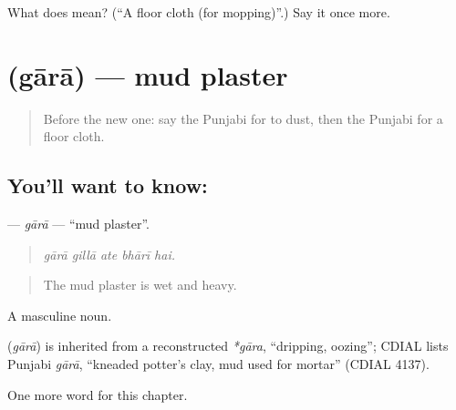 \begin{tcolorbox}[breakable,colback=teal!4,colframe=teal!35!black,title={Before you move on}]
What does  mean? (\textquotedblleft{}A floor cloth (for mopping)\textquotedblright{}.) Say it once more.
\end{tcolorbox}
\section[\texorpdfstring{\pa{ਗਾਰਾ} (gārā)}{ਗਾਰਾ (gārā)}]{ (gārā) — mud plaster}

\label{lesson:PA-C235-gara}



\begin{quote}
Before the new one: say the Punjabi for to dust, then the Punjabi for a floor cloth.
\end{quote}

\subsection*{You'll want to know: }
\textbf{} — \emph{gārā} — \textquotedblleft{}mud plaster\textquotedblright{}.

\begin{quote}
    
\end{quote}

\begin{quote}
\emph{gārā gillā ate bhārī hai.}
\end{quote}

\begin{quote}
The mud plaster is wet and heavy.
\end{quote}

A masculine noun.

\begin{cousinweb}
\textbf{} (\emph{gārā}) is inherited from a reconstructed \emph{*gāra}, \textquotedblleft{}dripping, oozing\textquotedblright{}; CDIAL lists Punjabi \emph{gārā}, \textquotedblleft{}kneaded potter's clay, mud used for mortar\textquotedblright{} (CDIAL 4137).
\end{cousinweb}

\begin{grammarlens}[title={What you've built}]
One more word for this chapter.
\end{grammarlens}

